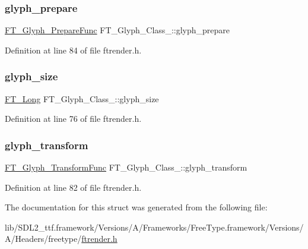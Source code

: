 \subsubsection{\texorpdfstring{glyph\_prepare}{glyph\_prepare}}
{\footnotesize\ttfamily \mbox{\hyperlink{ftrender_8h_ad8be01ff60862457d78927ebf1b90199}{F\+T\+\_\+\+Glyph\+\_\+\+Prepare\+Func}} F\+T\+\_\+\+Glyph\+\_\+\+Class\+\_\+\+::glyph\+\_\+prepare}



Definition at line 84 of file ftrender.\+h.

\mbox{\label{struct_f_t___glyph___class___a1a76c68b9fb0e93947e888c0fe77cbf8}} 
\subsubsection{\texorpdfstring{glyph\_size}{glyph\_size}}
{\footnotesize\ttfamily \mbox{\hyperlink{fttypes_8h_a7fa72a1f0e79fb1860c5965789024d6f}{F\+T\+\_\+\+Long}} F\+T\+\_\+\+Glyph\+\_\+\+Class\+\_\+\+::glyph\+\_\+size}



Definition at line 76 of file ftrender.\+h.

\mbox{\label{struct_f_t___glyph___class___a5f72ac1d0d92eb31fa3e2bb721a97ef2}} 
\subsubsection{\texorpdfstring{glyph\_transform}{glyph\_transform}}
{\footnotesize\ttfamily \mbox{\hyperlink{ftrender_8h_a6e39ad832662366565c93c53cf56fd0d}{F\+T\+\_\+\+Glyph\+\_\+\+Transform\+Func}} F\+T\+\_\+\+Glyph\+\_\+\+Class\+\_\+\+::glyph\+\_\+transform}



Definition at line 82 of file ftrender.\+h.



The documentation for this struct was generated from the following file\+:\begin{DoxyCompactItemize}
\item 
lib/\+S\+D\+L2\+\_\+ttf.\+framework/\+Versions/\+A/\+Frameworks/\+Free\+Type.\+framework/\+Versions/\+A/\+Headers/freetype/\mbox{\hyperlink{ftrender_8h}{ftrender.\+h}}\end{DoxyCompactItemize}
